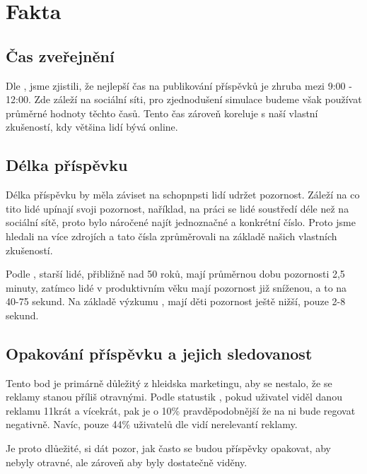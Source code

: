 \documentclass[11pt, a4paper]{article}
\begin{document}
\section{Fakta}

\subsection{Čas zveřejnění}
Dle \cite{TimeToPost}, jsme zjistili, že nejlepší čas na publikování příspěvků je zhruba mezi 9:00 - 12:00. Zde záleží na sociální síti, 
pro zjednodušení simulace budeme však používat průměrné hodnoty těchto časů.
Tento čas zároveň koreluje s naší vlastní zkušeností, kdy většina lidí bývá online.

\subsection{Délka příspěvku}
Délka příspěvku by měla záviset na schopnpsti lidí udržet pozornost. Záleží na co tito lidé upínají svoji pozornost,
naříklad, na práci se lidé soustředí déle než na sociální sítě, proto bylo náročené najít jednoznačné a konkrétní číslo.
Proto jsme hledali na více zdrojích a tato čísla zprůměrovali na základě našich vlastních zkušeností.

Podle \cite{AttentionSpan1}, starší lidé, přibližně nad 50 roků, mají průměrnou dobu pozornosti 2,5 minuty, zatímco lidé v produktivním věku mají pozornost již sníženou, a to na 40-75 sekund.
Na základě výzkumu \cite{AttentionSpan2}, mají děti pozornost ještě nižší, pouze 2-8 sekund.

\subsection{Opakování příspěvku a jejich sledovanost}
Tento bod je primárně důležitý z hleidska marketingu, aby se nestalo, že se reklamy stanou příliš otravnými.
Podle statustik \cite{SocialMediaAds}, pokud uživatel viděl danou reklamu 11krát a vícekrát, pak je o 10\% pravděpodobnější že na ni bude regovat negativně.
Navíc, pouze 44\% uživatelů dle \cite{SocialMediaAds-44} vidí nerelevantí reklamy. 

Je proto dlůežité, si dát pozor, jak často se budou příspěvky opakovat, aby nebyly otravné, ale zároveň aby byly dostatečně viděny.



\end{document}
